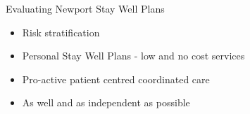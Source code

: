 \documentclass[xcolor={table}]{beamer}
\begin{document}

\begin{frame}{Evaluating Newport Stay Well Plans}
\begin{itemize}
\item Risk stratification
\item Personal Stay Well Plans - low and no cost services
\item Pro-active patient centred coordinated care
\item As well and as independent as possible
\end{itemize}
\end{frame}

\begin{frame}
\begin{center}

\end{center}
\end{frame}
\end{document}
